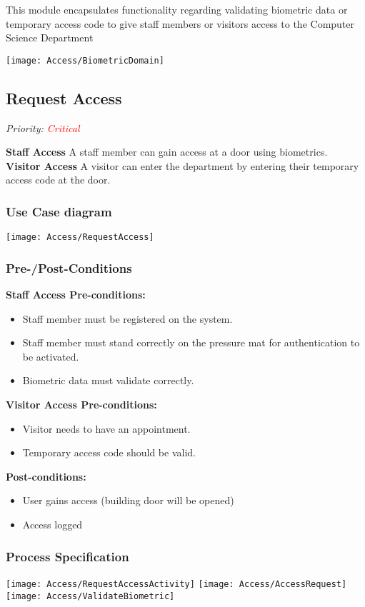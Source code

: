 
This module encapsulates functionality regarding validating biometric data or temporary access code to give staff members or visitors access to the Computer Science Department

\texttt{[image: Access/BiometricDomain]}

\subsection{Request Access}
\textit{ Priority: \textcolor{red}{Critical}} 

\textbf{Staff Access} A staff member can gain access at a door using biometrics. \\
\textbf{Visitor Access} A visitor can enter the department by entering their temporary access code at the door.

\subsubsection{Use Case diagram}
\texttt{[image: Access/RequestAccess]}

\subsubsection{Pre-/Post-Conditions}
\textbf{Staff Access Pre-conditions:} 
	\begin{itemize}
		\item Staff member must be registered on the system.
		\item Staff member must stand correctly on the pressure mat for authentication to be activated. 
		\item Biometric data must validate correctly.
	\end{itemize}
\textbf{Visitor Access Pre-conditions:} 
	\begin{itemize}
		\item Visitor needs to have an appointment.
		\item Temporary access code should be valid.
	\end{itemize}
\textbf{ Post-conditions:} 
	\begin{itemize}
		\item User gains access (building door will be opened)
		\item Access logged
	\end{itemize}
	
\subsubsection{Process Specification}
	\texttt{[image: Access/RequestAccessActivity]}	
	\texttt{[image: Access/AccessRequest]}
	\texttt{[image: Access/ValidateBiometric]}	

